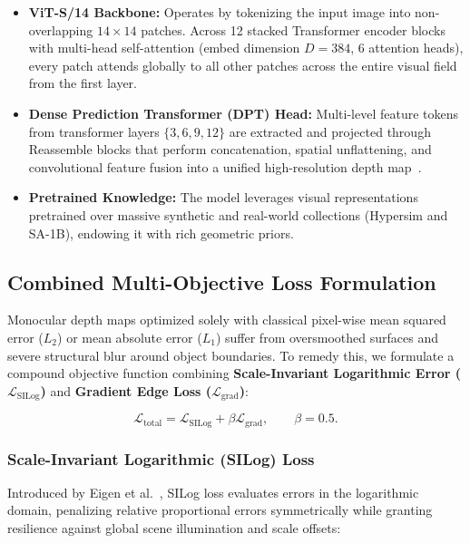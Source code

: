 \documentclass[twoside,final]{hcmut-report}
\begin{document}
\begin{itemize}

  \item \textbf{ViT-S/14 Backbone:} Operates by tokenizing the input image into non-overlapping $14 \times 14$ patches. Across 12 stacked Transformer encoder blocks with multi-head self-attention (embed dimension $D=384$, 6 attention heads), every patch attends globally to all other patches across the entire visual field from the first layer.

  \item \textbf{Dense Prediction Transformer (DPT) Head:} Multi-level feature tokens from transformer layers $\{3, 6, 9, 12\}$ are extracted and projected through Reassemble blocks that perform concatenation, spatial unflattening, and convolutional feature fusion into a unified high-resolution depth map~\cite{ranftl2021vision}.

  \item \textbf{Pretrained Knowledge:} The model leverages visual representations pretrained over massive synthetic and real-world collections (Hypersim and SA-1B), endowing it with rich geometric priors.

\end{itemize}

\subsection{Combined Multi-Objective Loss Formulation}

Monocular depth maps optimized solely with classical pixel-wise mean squared error ($L_2$) or mean absolute error ($L_1$) suffer from oversmoothed surfaces and severe structural blur around object boundaries. To remedy this, we formulate a compound objective function combining \textbf{Scale-Invariant Logarithmic Error ($\mathcal{L}_{\text{SILog}}$)} and \textbf{Gradient Edge Loss ($\mathcal{L}_{\text{grad}}$)}:

\begin{equation}
\mathcal{L}_{\mathrm{total}}
=\mathcal{L}_{\mathrm{SILog}}+\beta\mathcal{L}_{\mathrm{grad}},
\qquad\beta=0.5.
\end{equation}

\subsubsection{Scale-Invariant Logarithmic (SILog) Loss}

Introduced by Eigen et al.~\cite{eigen2014depth}, SILog loss evaluates errors in the logarithmic domain, penalizing relative proportional errors symmetrically while granting resilience against global scene illumination and scale offsets:
\end{document}
